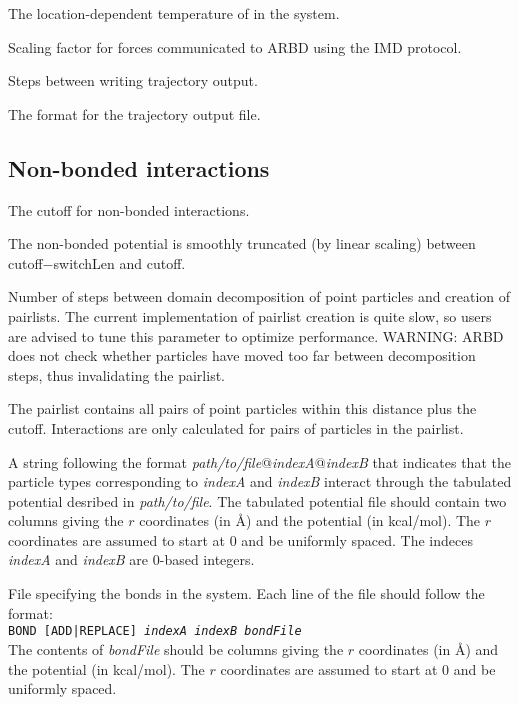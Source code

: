 \documentclass[10pt]{article}
\newcommand{\code}[1]{\texttt{#1}}
\begin{document}
{The location-dependent temperature of in the system.}

{Scaling factor for forces communicated to ARBD using the IMD protocol.}

{Steps between writing trajectory output.}

{The format for the trajectory output file.}

\subsection{Non-bonded interactions}
{The cutoff for non-bonded interactions.}

{The non-bonded potential is smoothly truncated (by linear scaling) between cutoff$-$switchLen and cutoff.}

{Number of steps between domain decomposition of point particles and creation of pairlists. The current implementation of pairlist creation is quite slow, so users are advised to tune this parameter to optimize performance. WARNING: ARBD does not check whether particles have moved too far between decomposition steps, thus invalidating the pairlist.}

{The pairlist contains all pairs of point particles within this distance plus the cutoff. Interactions are only calculated for pairs of particles in the pairlist.}


{A string following the format \textit{path/to/file}@\textit{indexA}@\textit{indexB} that indicates that the particle types corresponding to \textit{indexA} and \textit{indexB} interact through the tabulated potential desribed in \textit{path/to/file}. 
The tabulated potential file should contain two columns giving the $r$ coordinates (in \AA) and the potential (in kcal/mol).
The $r$ coordinates are assumed to start at 0 and be uniformly spaced. 
The indeces \textit{indexA} and \textit{indexB} are 0-based integers.}

{File specifying the bonds in the system.
Each line of the file should follow the format: \\\noindent
\code{BOND [ADD|REPLACE] \textit{indexA} \textit{indexB} \textit{bondFile}} \\\noindent
The contents of \textit{bondFile} should be columns giving the $r$ coordinates (in \AA) and the potential (in kcal/mol).
The $r$ coordinates are assumed to start at 0 and be uniformly spaced. 
}
\end{document}
